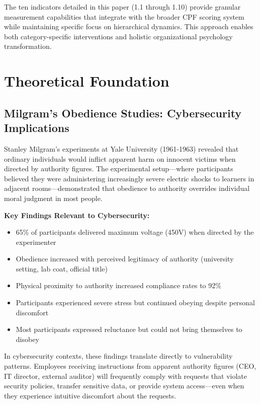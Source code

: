 \documentclass[11pt,a4paper]{article}
\begin{document}
The ten indicators detailed in this paper (1.1 through 1.10) provide granular measurement capabilities that integrate with the broader CPF scoring system while maintaining specific focus on hierarchical dynamics. This approach enables both category-specific interventions and holistic organizational psychology transformation.

\section{Theoretical Foundation}

\subsection{Milgram's Obedience Studies: Cybersecurity Implications}

Stanley Milgram's experiments at Yale University (1961-1963) revealed that ordinary individuals would inflict apparent harm on innocent victims when directed by authority figures. The experimental setup—where participants believed they were administering increasingly severe electric shocks to learners in adjacent rooms—demonstrated that obedience to authority overrides individual moral judgment in most people.

\textbf{Key Findings Relevant to Cybersecurity:}
\begin{itemize}
\item 65\% of participants delivered maximum voltage (450V) when directed by the experimenter
\item Obedience increased with perceived legitimacy of authority (university setting, lab coat, official title)
\item Physical proximity to authority increased compliance rates to 92\%
\item Participants experienced severe stress but continued obeying despite personal discomfort
\item Most participants expressed reluctance but could not bring themselves to disobey
\end{itemize}

In cybersecurity contexts, these findings translate directly to vulnerability patterns. Employees receiving instructions from apparent authority figures (CEO, IT director, external auditor) will frequently comply with requests that violate security policies, transfer sensitive data, or provide system access—even when they experience intuitive discomfort about the requests.
\end{document}
